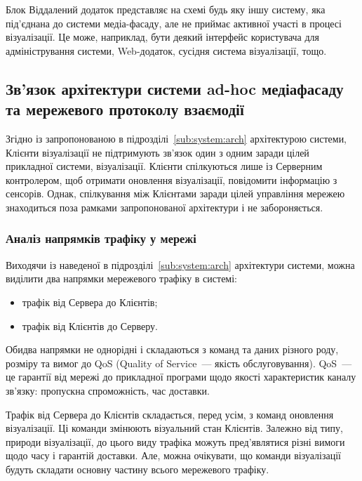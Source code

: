 \documentclass[a4paper,ukrainian,utf8,nocolumnsxix,nocolumnxxxii,nocolumnxxxi,floatsection,equationsection]{eskdtext}
\renewcommand\paragraph{\subsubsection}
\begin{document}
Блок Віддалений додаток представляє на схемі будь яку іншу систему, яка під'єднана до системи медіа-фасаду, але не приймає активної участі в процесі візуалізації. Це може, наприклад, бути деякий інтерфейс користувача для адміністрування системи, Web-додаток, сусідня система візуалізації, тощо.

\subsection{Зв'язок архітектури системи ad-hoc медіафасаду та мережевого протоколу взаємодії}

Згідно із запропонованою в підрозділі~\ref{sub:system:arch} архітектурою системи, Клієнти візуалізації не підтримують зв'язок один з одним заради цілей прикладної системи, візуалізації. Клієнти спілкуються лише із Серверним контролером, щоб отримати оновлення візуалізації, повідомити інформацію з сенсорів. Однак, спілкування між Клієнтами заради цілей управління мережею знаходиться поза рамками запропонованої архітектури і не забороняється.

\paragraph{Аналіз напрямків трафіку у мережі}
\label{par:traffic:cases}

Виходячи із наведеної в підрозділі~\ref{sub:system:arch} архітектури системи, можна виділити два напрямки мережевого трафіку в системі:
\begin{itemize}
	\item трафік від Сервера до Клієнтів;
	\item трафік від Клієнтів до Серверу.
\end{itemize}

Обидва напрямки не однорідні і складаються з команд та даних різного роду, розміру та вимог до QoS (Quality of Service~--- якість обслуговування). QoS~--- це гарантії від мережі до прикладної програми щодо якості характеристик каналу зв'язку: пропускна спроможність, час доставки.

Трафік від Сервера до Клієнтів складається, перед усім, з команд оновлення візуалізації. Ці команди змінюють візуальний стан Клієнтів. Залежно від типу, природи візуалізації, до цього виду трафіка можуть пред'являтися різні вимоги щодо часу і гарантій доставки. Але, можна очікувати, що команди візуалізації будуть складати основну частину всього мережевого трафіку.
\end{document}
